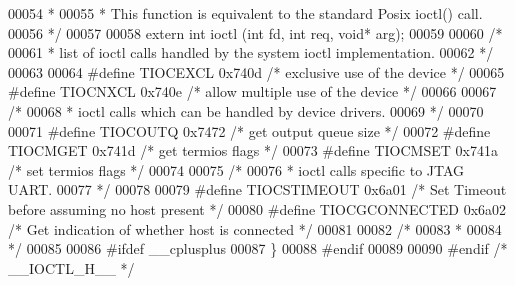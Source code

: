 \begin{DoxyCode}
00054 \textcolor{comment}{ *}
00055 \textcolor{comment}{ * This function is equivalent to the standard Posix ioctl() call.}
00056 \textcolor{comment}{ */}
00057 
00058 \textcolor{keyword}{extern} \textcolor{keywordtype}{int} ioctl (\textcolor{keywordtype}{int} fd, \textcolor{keywordtype}{int} req, \textcolor{keywordtype}{void}* arg);
00059 
00060 \textcolor{comment}{/*}
00061 \textcolor{comment}{ * list of ioctl calls handled by the system ioctl implementation.}
00062 \textcolor{comment}{ */}
00063 
00064 \textcolor{preprocessor}{#define TIOCEXCL 0x740d }\textcolor{comment}{/* exclusive use of the device */}\textcolor{preprocessor}{}
00065 \textcolor{preprocessor}{#define TIOCNXCL 0x740e }\textcolor{comment}{/* allow multiple use of the device */}\textcolor{preprocessor}{}
00066 
00067 \textcolor{comment}{/*}
00068 \textcolor{comment}{ * ioctl calls which can be handled by device drivers.}
00069 \textcolor{comment}{ */}
00070 
00071 \textcolor{preprocessor}{#define TIOCOUTQ 0x7472 }\textcolor{comment}{/* get output queue size */}\textcolor{preprocessor}{}
00072 \textcolor{preprocessor}{#define TIOCMGET 0x741d }\textcolor{comment}{/* get termios flags */}\textcolor{preprocessor}{}
00073 \textcolor{preprocessor}{#define TIOCMSET 0x741a }\textcolor{comment}{/* set termios flags */}\textcolor{preprocessor}{}
00074 
00075 \textcolor{comment}{/*}
00076 \textcolor{comment}{ * ioctl calls specific to JTAG UART.}
00077 \textcolor{comment}{ */}
00078 
00079 \textcolor{preprocessor}{#define TIOCSTIMEOUT 0x6a01 }\textcolor{comment}{/* Set Timeout before assuming no host present */}\textcolor{preprocessor}{}
00080 \textcolor{preprocessor}{#define TIOCGCONNECTED 0x6a02 }\textcolor{comment}{/* Get indication of whether host is connected */}\textcolor{preprocessor}{}
00081 
00082 \textcolor{comment}{/*}
00083 \textcolor{comment}{ *}
00084 \textcolor{comment}{ */}
00085 
00086 \textcolor{preprocessor}{#ifdef \_\_cplusplus}
00087 \}
00088 \textcolor{preprocessor}{#endif}
00089   
00090 \textcolor{preprocessor}{#endif }\textcolor{comment}{/* \_\_IOCTL\_H\_\_ */}\textcolor{preprocessor}{}
\end{DoxyCode}
